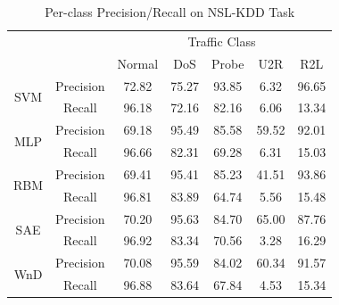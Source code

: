 \begin{table}[]
    \centering
    \caption{Per-class Precision/Recall on NSL-KDD Task}
    \label{Tab:PrecisionRecall}
    \begin{tabular}{c|c|ccccc}
        \hline
        \hline
                             &            & \multicolumn{5}{c}{Traffic Class} \\
        \cline{3-7}
                             &            & Normal & DoS   & Probe & U2R   & R2L \\
        \hline
        \multirow{2}{*}{SVM} & Precision  & 72.82  & 75.27 & 93.85 &  6.32 & 96.65 \\
        \cline{2-2}
                             & Recall     & 96.18  & 72.16 & 82.16 &  6.06 & 13.34 \\
        \hline
        \multirow{2}{*}{MLP} & Precision  & 69.18  & 95.49 & 85.58 & 59.52 & 92.01 \\
        \cline{2-2}
                             & Recall     & 96.66  & 82.31 & 69.28 &  6.31 & 15.03 \\
        \hline
        \multirow{2}{*}{RBM} & Precision  & 69.41  & 95.41 & 85.23 & 41.51 & 93.86 \\
        \cline{2-2}
                             & Recall     & 96.81  & 83.89 & 64.74 &  5.56 & 15.48 \\
        \hline
        \multirow{2}{*}{SAE} & Precision  & 70.20  & 95.63 & 84.70 & 65.00 & 87.76 \\
        \cline{2-2}
                             & Recall     & 96.92  & 83.34 & 70.56 &  3.28 & 16.29 \\
        \hline
        \multirow{2}{*}{WnD} & Precision  & 70.08  & 95.59 & 84.02 & 60.34 & 91.57 \\
        \cline{2-2}
                             & Recall     & 96.88  & 83.64 & 67.84 &  4.53 & 15.34 \\
        \hline
    \end{tabular}
\end{table}

